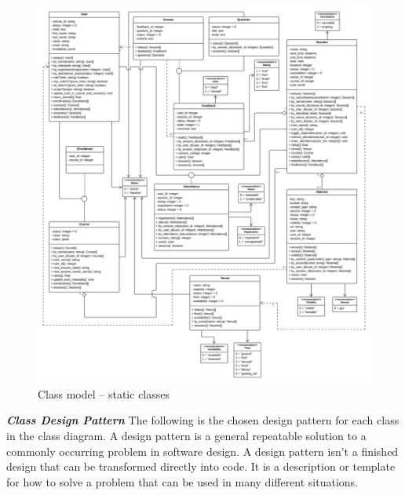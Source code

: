 \begin{justify}
\begin{figure}[H]
    \centerline{\includegraphics[width=140mm,scale=1]{figures/analysis_and_design/design/Static Class Diagram V3.png}}
    \caption{Class model -- static classes}
    \label{ClassModelStatic}
\end{figure}

\clearpage
\newendline \textbf{\textit{Class Design Pattern}}\newendline
The following is the chosen design pattern for each class in the class diagram. A design pattern is a general repeatable solution to a commonly occurring problem in software design. A design pattern isn't a finished design that can be transformed directly into code. It is a description or template for how to solve a problem that can be used in many different situations.


\end{justify}
